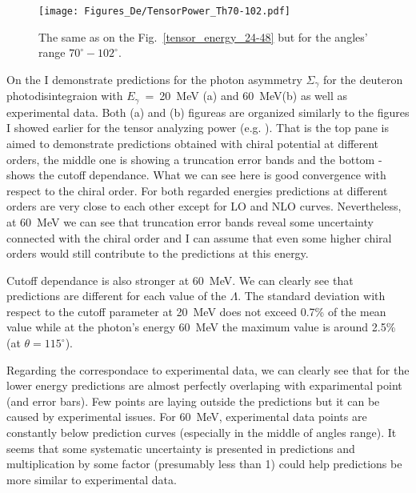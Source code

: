     \begin{figure}[h]
        \begin{center}
        \texttt{[image: Figures\_De/TensorPower\_Th70-102.pdf]}
        \end{center}
        \caption{The same as on the Fig.~\ref*{tensor_energy_24-48} but
        for the angles' range $70^{\circ} - 102^{\circ}$.}
        \label{tensor_energy_70-102}
    \end{figure}
    
    On the  I demonstrate predictions
    for the photon asymmetry $\Sigma_\gamma$ for the 
    deuteron photodisintegraion with $E_\gamma$~=~20~MeV (a)
    and 60~MeV(b) as well as experimental data.
    Both (a) and (b) figureas are organized similarly to the 
    figures I showed earlier for the tensor analyzing power (e.g. ).
    That is the top pane is aimed to demonstrate predictions obtained
    with chiral potential at different orders, the middle 
    one is showing a truncation error bands and the bottom - shows 
    the cutoff dependance. What we can see here is good 
    convergence with respect to the chiral order. For both regarded 
    energies predictions at different orders are very close to each other
    except for LO and NLO curves. Nevertheless, at 60~MeV we can see 
    that truncation error bands reveal some uncertainty connected 
    with the chiral order and I can assume that even some higher chiral 
    orders would still contribute to the predictions at this energy.

    Cutoff dependance is also stronger at 60~MeV. We can clearly see
    that predictions are different for each value of the $\Lambda$.
    The standard deviation with respect to the cutoff parameter at 20~MeV
    does not exceed 0.7\% of the mean value while at the photon's energy 60~MeV
     the maximum value is around 2.5\% (at $\theta = 115^\circ$).

     Regarding the correspondace to experimental data, we can clearly see that
     for the lower energy predictions are almost perfectly overlaping
     with exparimental point (and error bars). Few points are laying
     outside the predictions but it can be caused by experimental issues.
     For 60~MeV, experimental data points are constantly below prediction
     curves (especially in the middle of angles range). It seems that some systematic 
     uncertainty is presented in predictions and multiplication by some factor
     (presumably less than 1)
     could help predictions be more similar to experimental data.


